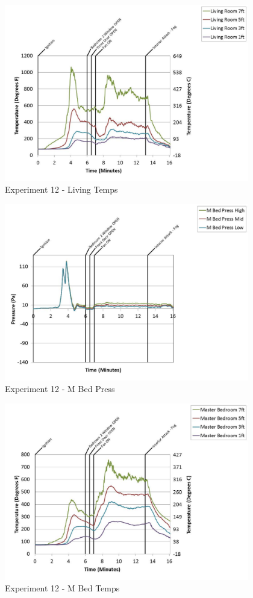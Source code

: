 \documentclass{article}
\begin{document}
\begin{appendices}
	\begin{figure}[h!]
		\centering
		\includegraphics[height=3.05in]{0_Images/Results_Charts/Exp_12_Charts/LivingTemps.pdf}
		\caption{Experiment 12 - Living Temps}
	\end{figure}
 
	\clearpage

	\begin{figure}[h!]
		\centering
		\includegraphics[height=3.05in]{0_Images/Results_Charts/Exp_12_Charts/MBedPress.pdf}
		\caption{Experiment 12 - M Bed Press}
	\end{figure}
 

	\begin{figure}[h!]
		\centering
		\includegraphics[height=3.05in]{0_Images/Results_Charts/Exp_12_Charts/MBedTemps.pdf}
		\caption{Experiment 12 - M Bed Temps}
	\end{figure}
 

\end{appendices}
\end{document}
